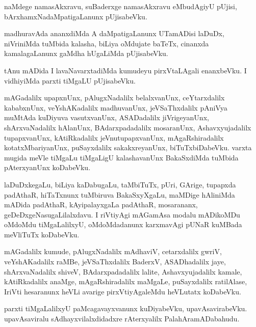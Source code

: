 \documentclass{article}
\begin{document}
\begin{mn}
naMdege  namasAkxravu,  suBaderxge  namasAkxravu  eMbudAgiyU  pUjisi,  bArxhamxNadaMpatigaLanunx  pUjisabeVku.
\end{mn}

\begin{mn}
madhuravAda  ananxdiMda  A  daMpatigaLanunx  UTamADisi  laDuDx,  niVriniMda  tuMbida  kalasha,  biLiya  
oMdujate  baTeTx,  cinanxda  kamalagaLanunx  gaMdha  hUgaLiMda  pUjisabeVku.
\end{mn}

\begin{mn}
tAnu  mADida  I  lavaNavarxtadiMda  kumudeyu  pirxVtaLAgali  enanxbeVku.  I  vidhiyiMda  parxti  tiMgaLU  pUjisabeVku. 
\end{mn}

\begin{mn}
mAGadalilx  upapxnUnx,  pAlugxNadalilx  belalxvanUnx,  ceYtarxdalilx  kababxnUnx,  veYshAKadalilx  madhuvanUnx,  
jeVSaThxdalilx  pAniVya  muMtAda  kuDiyuva  vasutxvanUnx,  ASADadalilx  jiVrigeyanUnx,  shArxvaNadalilx  hAlanUnx,  
BAdarxpadadalilx  mosaranUnx,  Ashavxyujadalilx  tupapxvanUnx,  kAtiRkadalilx  jeVnutupapxvanUnx,  mAgaRshiradalilx  
kotatxMbariyanUnx,  puSayxdalilx  sakakxreyanUnx,  biTuTxbiDabeVku.  varxta  mugida  meVle  tiMgaLu  tiMgaLigU  
kalashavanUnx  BakaSxdiMda  tuMbida  pAterxyanUnx  koDabeVku.
\end{mn}

\begin{mn}
laDuDxkegaLu,  biLiya  kaDabugaLu,  taMbiTuTx,  pUri,  GArige,  tupapxda  padAthaR,  hiTaTxnunx  
tuMbiruva  BakaSxyXgaLu,  maMDige  hAliniMda  mADida  padAthaR,  kAyipalayxgaLa  padAthaR,  mosarananx,  
geDeDxgeNasugaLilalxdavu.  I riVtiyAgi  mAGamAsa  modalu  mADikoMDu  oMdoMdu  tiMgaLalilxyU,  
oMdoMdadanunx  karxmavAgi  pUNaR  kuMBada  meVliTuTx  koDabeVku.
\end{mn}

\begin{mn}
mAGadalilx  kumude,  pAlugxNadalilx  mAdhaviV,  cetarxdalilx  gwriV,  veYshAKadalilx  raMBe,  
jeVSaThxdalilx  BaderxV,  ASADhadalilx  jaye,  shArxvaNadalilx  shiveV,  BAdarxpadadalilx  lalite,  
Ashavxyujadalilx  kamale,  kAtiRkadalilx  anaMge,  mAgaRshiradalilx  maMgaLe,  puSayxdalilx  
ratilAlase,  IriVti  hesaranunx  heVLi  avarige  pirxVtiyAgaleMdu  heVLutatx  koDabeVku.  
\end{mn}

\begin{mn}
parxti  tiMgaLalilxyU  paMcagavayxvanunx  kuDiyabeVku,  upavAsavirabeVku.  upavAsaviralu  
sAdhayxvilalxdidadxre  rAterxyalilx  PalahAramADabahudu.
\end{mn}
\end{document}
